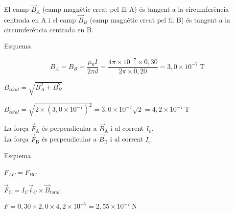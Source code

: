 \begin{solapartat}
\begin{minipage}[c]{0.68\linewidth}
El camp $\vec{B}_A$ (camp magnètic creat pel fil A) és tangent a la circumferència centrada en A i el camp $\vec{B}_B$ (camp magnètic creat pel fil B) és tangent a la circumferència centrada en B.
\end{minipage}\hfill
\begin{minipage}[c]{0.28\linewidth}
\end{minipage}

 Esquema

\[ B_A = B_B = \frac{\mu_0 I}{2\pi d} = \frac{4\pi\times 10^{-7}\times 0,30}{2\pi\times 0,20} = 3,0\times 10^{-7}\ \mathrm{T} \]

 $B_{total} = \sqrt{B_A^2 + B_B^2}$

 $B_{total} = \sqrt{2\times\left(3,0\times 10^{-7}\right)^2} = 3,0\times 10^{-7}\sqrt{2} = 4,2\times 10^{-7}\ \mathrm{T}$
\end{solapartat}

\begin{solapartat}
La força $\vec{F}_\mathrm{A}$ és perpendicular a $\vec{B}_\mathrm{A}$ i al corrent $I_\mathrm{c}$.\\
La força $\vec{F}_\mathrm{B}$ és perpendicular a $\vec{B}_\mathrm{B}$ i al corrent $I_\mathrm{c}$.

 Esquema

 $F_{AC} = F_{BC}$

 $\vec{F}_C = I_C\vec{l}_C\times\vec{B}_{total}$

 $F = 0,30\times 2,0\times 4,2\times 10^{-7} = 2,55\times 10^{-7}\ \mathrm{N}$
\end{solapartat}
